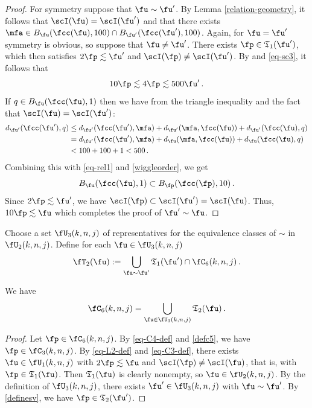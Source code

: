 \begin{proof}
    For symmetry suppose that $\fu \sim \fu'$. By Lemma \eqref{relation-geometry}, it follows that $\scI(\fu) = \scI(\fu')$ and that there exists $\mfa \in B_{\fu}(\fcc(\fu), 100) \cap B_{\fu'}(\fcc(\fu'), 100)$. Again, for $\fu = \fu'$ symmetry is obvious, so suppose that $\fu \ne \fu'$. There exists $\fp \in \mathfrak{T}_1(\fu')$, which then satisfies $2\fp\lesssim \fu'$ and $\scI(\fp) \neq \scI(\fu')$. By  and \eqref{eq-sc3}, it follows that
    \begin{equation}
        \label{eq-rel1}
        10\fp \lesssim 4\fp \lesssim 500 \fu'\,.
    \end{equation}
    If $q \in B_{\fu}(\fcc(\fu),1)$ then we have from the triangle inequality and the fact that $\scI(\fu) = \scI(\fu')$:
    \begin{align*}
        d_{\fu'}(\fcc(\fu'), q) &\le d_{\fu'}(\fcc(\fu'), \mfa) + d_{\fu'}(\mfa, \fcc(\fu)) + d_{\fu'}(\fcc(\fu), q)\\
        &= d_{\fu'}(\fcc(\fu'), \mfa) + d_{\fu}(\mfa, \fcc(\fu)) + d_{\fu}(\fcc(\fu), q)\\
        &< 100 + 100 + 1 < 500\,.
    \end{align*}
    Combining this with \eqref{eq-rel1} and \eqref{wiggleorder}, we get
    \begin{equation*}
     B_{\fu}(\fcc(\fu), 1) \subset B_{\fp}(\fcc(\fp), 10)\, .
    \end{equation*}
    Since $2\fp \lesssim \fu'$, we have $\scI(\fp) \subset \scI(\fu') = \scI(\fu)$. Thus, $10\fp \lesssim \fu$ which completes the proof of $\fu' \sim \fu$.
\end{proof}

Choose a set $\fU_3(k,n,j)$ of representatives for the equivalence
classes of $\sim$ in $\fU_2(k,n,j)$.
Define for each $\fu\in \fU_3(k,n,j)$
\begin{equation}\label{definesv}
\fT_2(\fu):=
   \bigcup_{\fu\sim \fu'}\mathfrak{T}_1(\fu')\cap \fC_6(k,n,j)\, .
\end{equation}

\begin{lemma}[C6 forest]
\label{C6-forest}
\leanok
{}
We have
\begin{equation}
    \fC_6(k,n,j)=\bigcup_{\fu\in \fU_3(k,n,j)}\mathfrak{T}_2(\fu)\, .
\end{equation}
\end{lemma}
\begin{proof}
    \leanok
    Let $\fp \in \fC_6(k,n,j)$.
    By \eqref{eq-C4-def} and \eqref{defc5}, we have $\fp \in \fC_3(k,n,j)$. By \eqref{eq-L2-def} and \eqref{eq-C3-def}, there exists $\fu \in \fU_1(k,n,j)$ with $2\fp \lesssim \fu$ and $\scI(\fp) \ne \scI(\fu)$, that is, with $\fp \in \mathfrak{T}_1(\fu)$. Then $\mathfrak{T}_1(\fu)$ is clearly nonempty, so $\fu \in \fU_2(k,n,j)$. By the definition of $\fU_3(k,n,j)$, there exists $\fu' \in \fU_3(k,n,j)$ with $\fu \sim \fu'$. By \eqref{definesv}, we have $\fp \in \mathfrak{T}_2(\fu')$.
\end{proof}

